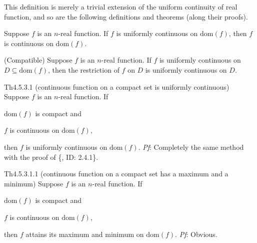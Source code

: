 \documentclass{article}
\begin{document}
\begin{Rmk}{}
    This definition is merely a trivial extension of the uniform continuity of real function, and so are the following definitions and theorems (along their proofs).
    \begin{compactenum}
        \item \textcolor{Th}{Suppose $f$ is an $n$-real function. If $f$ is uniformly continuous on $\text{dom}(f)$, then $f$ is continuous on $\text{dom}(f)$.}
        \item \textcolor{Th}{(Compatible) Suppose $f$ is an $n$-real function. If $f$ is uniformly continuous on $D\subseteq\text{dom}(f)$, then the restriction of $f$ on $D$ is uniformly continuous on $D$.}
    \end{compactenum}
\end{Rmk}

\begin{Th}{Th4.5.3.1 (continuous function on a compact set is uniformly continuous)}
    Suppose $f$ is an $n$-real function. If
    \begin{compactenum}
        \item $\text{dom}(f)$ is compact and
        \item $f$ is continuous on $\text{dom}(f)$,
    \end{compactenum}
    then $f$ is uniformly continuous on $\text{dom}(f)$.
    \tcblower
    \textit{Pf}: Completely the same method with the proof of \{, ID: 2.4.1\}.
\end{Th}

\begin{Th}{Th4.5.3.1.1 (continuous function on a compact set has a maximum and a minimum)}
    Suppose $f$ is an $n$-real function. If
    \begin{compactenum}
        \item $\text{dom}(f)$ is compact and
        \item $f$ is continuous on $\text{dom}(f)$,
    \end{compactenum}
    then $f$ attains its maximum and minimum on $\text{dom}(f)$.
    \tcblower
    \textit{Pf}: Obvious.
\end{Th}
\end{document}
